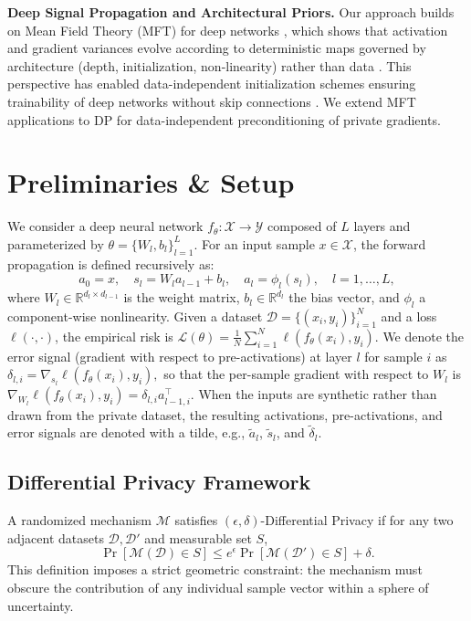 \documentclass{article}
\theoremstyle{plain}
\theoremstyle{definition}
\theoremstyle{remark}
\begin{document}
\textbf{Deep Signal Propagation and Architectural Priors.}
Our approach builds on Mean Field Theory (MFT) for deep networks \cite{poole2016exponential, schoenholz2016deep}, which shows that activation and gradient variances evolve according to deterministic maps governed by architecture (depth, initialization, non-linearity) rather than data \cite{yang2017mean}. This perspective has enabled data-independent initialization schemes ensuring trainability of deep networks without skip connections \cite{xiao2018dynamicalisometrymeanfield}. We extend MFT applications to DP for data-independent preconditioning of private gradients.


\section{Preliminaries \& Setup}
\label{sec:prelim}

We consider a deep neural network $f_\theta: \mathcal{X} \rightarrow \mathcal{Y}$ composed of $L$ layers and parameterized by $\theta = \{W_l, b_l\}_{l=1}^L$. For an input sample $x \in \mathcal{X}$, the forward propagation is defined recursively as:
\[
a_0 = x, \quad
s_l = W_l a_{l-1} + b_l, \quad
a_l = \phi_l(s_l), \quad l = 1, \dots, L,
\]
where $W_l \in \mathbb{R}^{d_l \times d_{l-1}}$ is the weight matrix, $b_l \in \mathbb{R}^{d_l}$ the bias vector, and $\phi_l$ a component-wise nonlinearity. Given a dataset $\mathcal{D} = \{(x_i, y_i)\}_{i=1}^N$ and a loss $\ell(\cdot,\cdot)$, the empirical risk is
$
\mathcal{L}(\theta) = \frac{1}{N} \sum_{i=1}^N \ell(f_\theta(x_i), y_i).
$
We denote the error signal (gradient with respect to pre-activations) at layer $l$ for sample $i$ as
$
\delta_{l,i} = \nabla_{s_l} \ell(f_\theta(x_i), y_i),
$
so that the per-sample gradient with respect to $W_l$ is
$
\nabla_{W_l} \ell(f_\theta(x_i), y_i) = \delta_{l,i} a_{l-1,i}^\top.
$ When the inputs are synthetic rather than drawn from the private dataset, the resulting activations, pre-activations, and error signals are denoted with a tilde, e.g., $\tilde{a}_l$, $\tilde{s}_l$, and $\tilde{\delta}_l$.


\subsection{Differential Privacy Framework}
A randomized mechanism $\mathcal{M}$ satisfies $(\epsilon,\delta)$-Differential Privacy \cite{Dwork2006} if for any two adjacent datasets $\mathcal{D}, \mathcal{D}'$ and measurable set $S$,
\[
\Pr[\mathcal{M}(\mathcal{D}) \in S] \le e^\epsilon \Pr[\mathcal{M}(\mathcal{D}') \in S] + \delta.
\]
This definition imposes a strict geometric constraint: the mechanism must obscure the contribution of any individual sample vector within a sphere of uncertainty.
\end{document}
